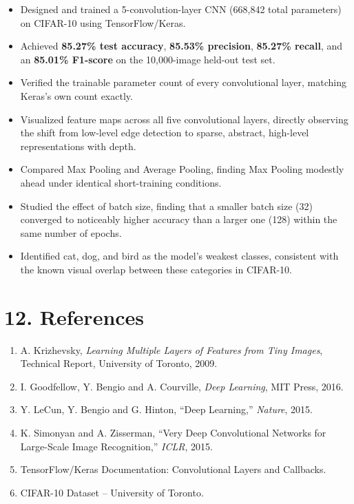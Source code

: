 \documentclass[11pt]{article}
\begin{document}
\begin{itemize}[leftmargin=*]
\item Designed and trained a 5-convolution-layer CNN (668,842 total parameters) on CIFAR-10 using TensorFlow/Keras.
\item Achieved \textbf{85.27\% test accuracy}, \textbf{85.53\% precision}, \textbf{85.27\% recall}, and an \textbf{85.01\% F1-score} on the 10,000-image held-out test set.
\item Verified the trainable parameter count of every convolutional layer, matching Keras's own count exactly.
\item Visualized feature maps across all five convolutional layers, directly observing the shift from low-level edge detection to sparse, abstract, high-level representations with depth.
\item Compared Max Pooling and Average Pooling, finding Max Pooling modestly ahead under identical short-training conditions.
\item Studied the effect of batch size, finding that a smaller batch size (32) converged to noticeably higher accuracy than a larger one (128) within the same number of epochs.
\item Identified cat, dog, and bird as the model's weakest classes, consistent with the known visual overlap between these categories in CIFAR-10.
\end{itemize}


\section*{12. References}

\begin{enumerate}
\item A. Krizhevsky, \emph{Learning Multiple Layers of Features from Tiny Images}, Technical Report, University of Toronto, 2009.
\item I. Goodfellow, Y. Bengio and A. Courville, \emph{Deep Learning}, MIT Press, 2016.
\item Y. LeCun, Y. Bengio and G. Hinton, ``Deep Learning,'' \emph{Nature}, 2015.
\item K. Simonyan and A. Zisserman, ``Very Deep Convolutional Networks for Large-Scale Image Recognition,'' \emph{ICLR}, 2015.
\item TensorFlow/Keras Documentation: Convolutional Layers and Callbacks.
\item CIFAR-10 Dataset -- University of Toronto.
\end{enumerate}
\end{document}
